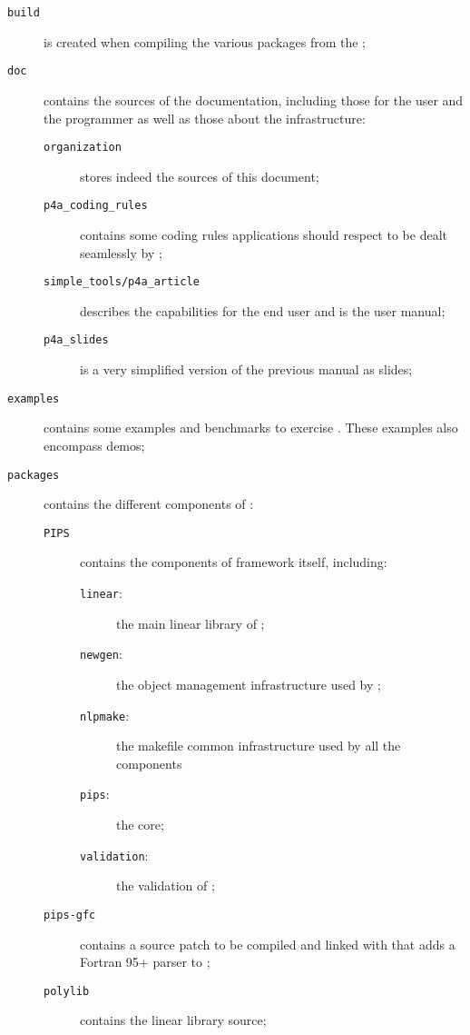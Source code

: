 \documentclass[a4paper]{article}
\begin{document}
\begin{description}
\item[\texttt{build}] is created when compiling the various
  \Apfa packages from the \Aautotools;
\item[\texttt{doc}] contains the sources of the \Apfa documentation,
  including those for the user and the programmer as well as those
  about the infrastructure:
  \begin{description}
  \item[\texttt{organization}] stores indeed the sources of this document;
  \item[\texttt{p4a\_coding\_rules}] contains some coding rules
    applications should respect to be dealt seamlessly by \Apfa;
  \item[\texttt{simple\_tools/p4a\_article}] describes the \Apfa
    capabilities for the end user and is the user manual;
  \item[\texttt{p4a\_slides}] is a very simplified version of the previous
    manual as slides;
  \end{description}
\item[\texttt{examples}] contains some examples and benchmarks to exercise
  \Apfa. These examples also encompass \Apfa demos;
\item[\texttt{packages}] contains the different components of \Apfa:
  \begin{description}
  \item[\texttt{PIPS}] contains the components of \Apips framework
    itself, including:
    \begin{description}
    \item[\texttt{linear}:] the main linear library of \Apips;
    \item[\texttt{newgen}:] the object management infrastructure used by
      \Apips;
    \item[\texttt{nlpmake}:] the makefile common infrastructure used by
      all the \Apips components
    \item[\texttt{pips}:] the \Apips core;
    \item[\texttt{validation}:] the validation of \Apips;
    \end{description}
  \item[\texttt{pips-gfc}] contains a  source patch to be
    compiled and linked with \Apips that adds a Fortran 95+ parser to \Apips;
  \item[\texttt{polylib}] contains the \Apolylib linear library source;
  \end{description}

\end{description}
\end{document}
